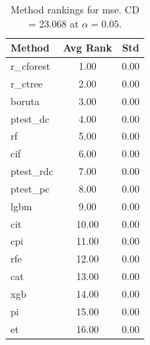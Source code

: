\begin{table}[h]
\centering
\caption{Method rankings for mse. CD = 23.068 at $\alpha=0.05$.}
\label{tab:ranks_mse}
\begin{tabular}{lcc}
\toprule
Method & Avg Rank & Std \\
\midrule
r_cforest & 1.00 & 0.00 \\
r_ctree & 2.00 & 0.00 \\
boruta & 3.00 & 0.00 \\
ptest_dc & 4.00 & 0.00 \\
rf & 5.00 & 0.00 \\
cif & 6.00 & 0.00 \\
ptest_rdc & 7.00 & 0.00 \\
ptest_pc & 8.00 & 0.00 \\
lgbm & 9.00 & 0.00 \\
cit & 10.00 & 0.00 \\
cpi & 11.00 & 0.00 \\
rfe & 12.00 & 0.00 \\
cat & 13.00 & 0.00 \\
xgb & 14.00 & 0.00 \\
pi & 15.00 & 0.00 \\
et & 16.00 & 0.00 \\
\bottomrule
\end{tabular}
\end{table}